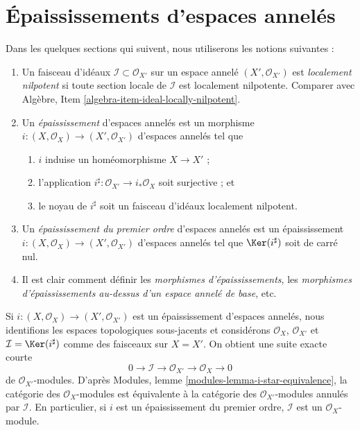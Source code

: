 \section{Épaississements d'espaces annelés}
\label{section-thickenings-spaces}

\noindent
Dans les quelques sections qui suivent, nous utiliserons les notions suivantes :
\begin{enumerate}
\item Un faisceau d'idéaux $\mathcal{I} \subset \mathcal{O}_{X'}$ sur
un espace annelé $(X', \mathcal{O}_{X'})$ est {\it localement nilpotent}
si toute section locale de $\mathcal{I}$ est localement nilpotente.
Comparer avec Algèbre, Item \ref{algebra-item-ideal-locally-nilpotent}.
\item Un {\it épaississement} d'espaces annelés est un morphisme
$i : (X, \mathcal{O}_X) \to (X', \mathcal{O}_{X'})$ d'espaces annelés
tel que
\begin{enumerate}
\item $i$ induise un homéomorphisme $X \to X'$ ;
\item l'application $i^\sharp : \mathcal{O}_{X'} \to i_*\mathcal{O}_X$
soit surjective ; et
\item le noyau de $i^\sharp$ soit un faisceau d'idéaux localement nilpotent.
\end{enumerate}
\item Un {\it épaississement du premier ordre} d'espaces annelés est un épaississement
$i : (X, \mathcal{O}_X) \to (X', \mathcal{O}_{X'})$ d'espaces annelés
tel que $\Ker(i^\sharp)$ soit de carré nul.
\item Il est clair comment définir les {\it morphismes d'épaississements},
les {\it morphismes d'épaississements au-dessus d'un espace annelé de base}, etc.
\end{enumerate}
Si $i : (X, \mathcal{O}_X) \to (X', \mathcal{O}_{X'})$ est un épaississement
d'espaces annelés, nous identifions les espaces topologiques sous-jacents
et considérons $\mathcal{O}_X$, $\mathcal{O}_{X'}$ et
$\mathcal{I} = \Ker(i^\sharp)$ comme des faisceaux sur $X = X'$. On obtient
une suite exacte courte
$$
0 \to \mathcal{I} \to \mathcal{O}_{X'} \to \mathcal{O}_X \to 0
$$
de $\mathcal{O}_{X'}$-modules. D'après
Modules, lemme \ref{modules-lemma-i-star-equivalence},
la catégorie des $\mathcal{O}_X$-modules est équivalente à la catégorie
des $\mathcal{O}_{X'}$-modules annulés par $\mathcal{I}$. En particulier,
si $i$ est un épaississement du premier ordre,
$\mathcal{I}$ est un $\mathcal{O}_X$-module.

